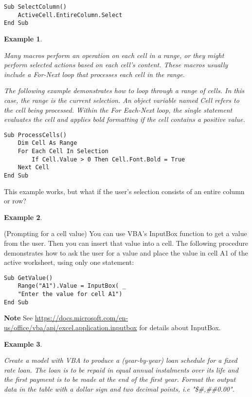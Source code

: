 \documentclass[
]{article}
\theoremstyle{definition}
\theoremstyle{definition}
\newtheorem{example}{Example}[section]
\theoremstyle{definition}
\theoremstyle{definition}
\theoremstyle{remark}
\begin{document}
\begin{verbatim}
Sub SelectColumn()
    ActiveCell.EntireColumn.Select
End Sub
\end{verbatim}

\begin{example}
\protect\hypertarget{exm:unlabeled-div-31}{}\label{exm:unlabeled-div-31}

\emph{Many macros perform an operation on each cell in a
range, or they might perform selected actions based on each cell's
content. These macros usually include a For-Next loop that processes
each cell in the range.}

\emph{The following example demonstrates how to loop through a range of
cells. In this case, the range is the current selection. An object
variable named Cell refers to the cell being processed. Within the For
Each-Next loop, the single statement evaluates the cell and applies bold
formatting if the cell contains a positive value.}

\end{example}

\begin{verbatim}
Sub ProcessCells()
    Dim Cell As Range
    For Each Cell In Selection
        If Cell.Value > 0 Then Cell.Font.Bold = True
    Next Cell
End Sub
\end{verbatim}

This example works, but what if the user's selection consists of an
entire column or row?

\begin{example}
\protect\hypertarget{exm:unlabeled-div-32}{}\label{exm:unlabeled-div-32}

(Prompting for a cell value) You can use VBA's
InputBox function to get a value from the user. Then you can insert
that value into a cell. The following procedure demonstrates how to ask the user for a value and place the value in cell A1 of the active
worksheet, using only one statement:

\end{example}

\begin{verbatim}
Sub GetValue()
    Range("A1").Value = InputBox( _
    "Enter the value for cell A1")
End Sub
\end{verbatim}

\textbf{Note} See
\url{https://docs.microsoft.com/en-us/office/vba/api/excel.application.inputbox}
for details about InputBox.

\begin{example}
\protect\hypertarget{exm:unlabeled-div-33}{}\label{exm:unlabeled-div-33}

\emph{Create a model with VBA to produce a (year-by-year)
loan schedule for a fixed rate loan. The loan is to be repaid in equal annual instalments over its life and the first payment is to be made at the end of the first year. Format the output data in the table with a dollar sign and two decimal points, i.e "\$\#,\#\#0.00".}

\end{example}
\end{document}
